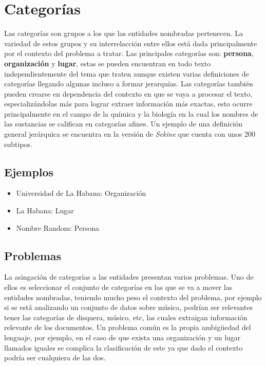 \documentclass[runningheads]{llncs}
\begin{document}
\section{Categorías}

Las categorías son grupos a los que las entidades nombradas pertenecen. La variedad de estos grupos y su interrelacción entre ellos está dada principalmente por el contexto del problema a tratar. Las principales categorías son: \textbf{persona}, \textbf{organización} y \textbf{lugar}, estas se pueden encuentran en todo texto independientemente del tema que traten aunque existen varias definiciones de categorías llegando algunas incluso a formar jerarquías. Las categorías también pueden crearse en dependencia del contexto en que se vaya a procesar el texto, especializándolas más para lograr extraer información más exactas, esto ocurre principalmente en el campo de la química y la biología en la cual los nombres de las sustancias se califican en categorías afines. Un ejemplo de una definición general jerárquica se encuentra en la versión de \emph{Sekine}\cite{sekine} que cuenta con unos 200 subtipos.

\subsection{Ejemplos}

\begin{itemize}

\item Universidad de La Habana: Organización
\item La Habana: Lugar
\item Nombre Random: Persona %

\end{itemize}

\subsection{Problemas}

La asingación de categorías a las entidades presentan varios problemas. Uno de ellos es seleccionar el conjunto de categorías en las que se va a mover las entidades nombradas, teniendo mucho peso el contexto del problema, por ejemplo si se está analizando un conjunto de datos sobre música, podrían ser relevantes tener las categorías de disquera, músico, etc, las cuales extraigan información relevante de los documentos. Un problema común es la propia ambigüedad del lenguaje, por ejemplo, en el caso de que exista una organización y un lugar llamados iguales se complica la clasificación de este ya que dado el contexto podría ser cualquiera de las dos. %
\end{document}

